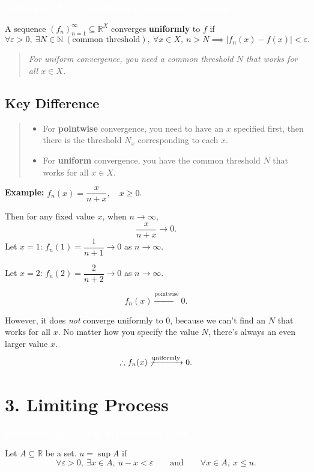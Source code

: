 \documentclass[11pt]{article}
\newcommand{\deftitle}[1]{%
  \vspace{0.6em}
  \noindent\colorbox{defbg!70}{\parbox{\dimexpr\textwidth-2\fboxsep}{\textbf{\textcolor{white}{#1}}}}
  \vspace{0.4em}
}
\newenvironment{note}{\begin{quote}\color{noteblue}\itshape}{\end{quote}}
\newenvironment{remark}{\begin{quote}\color{notepink}}{\end{quote}}
\begin{document}
\deftitle{Definition 1.1.3 --- Functional Convergence: Uniform}

A sequence $(f_n)_{n=1}^{\infty} \subseteq \mathbb{R}^X$ converges \textbf{uniformly} to $f$ if
\[
\forall \varepsilon > 0,\ \exists N \in \mathbb{N}\ (\text{common threshold}),\ \forall x \in X,\ n > N \implies |f_n(x) - f(x)| < \varepsilon.
\]

\begin{note}
For uniform convergence, you need a \emph{common} threshold $N$ that works for all $x \in X$.
\end{note}

\subsection*{Key Difference}
\begin{remark}
\begin{itemize}
  \item For \textbf{pointwise} convergence, you need to have an $x$ specified first, then there is the threshold $N_x$ corresponding to each $x$.
  \item For \textbf{uniform} convergence, you have the common threshold $N$ that works for all $x \in X$.
\end{itemize}
\end{remark}

\noindent \textbf{Example:} $f_n(x) = \dfrac{x}{n+x}, \quad x \geq 0$.

Then for any fixed value $x$, when $n \to \infty$,
\[
\frac{x}{n+x} \to 0.
\]
Let $x = 1$: $f_n(1) = \dfrac{1}{n+1} \to 0$ as $n \to \infty$.

Let $x = 2$: $f_n(2) = \dfrac{2}{n+2} \to 0$ as $n \to \infty$.

\[
f_n(x) \xrightarrow{\text{pointwise}} 0.
\]

However, it does \emph{not} converge uniformly to $0$, because we can't find an $N$ that works for all $x$. No matter how you specify the value $N$, there's always an even larger value $x$.
\[
\therefore f_n(x) \not\xrightarrow{\text{uniformly}} 0.
\]

\section*{3. Limiting Process}

\deftitle{Definition 1.2.1 --- The Supremum of a Set}

Let $A \subseteq \mathbb{R}$ be a set. $u = \sup A$ if
\[
\forall \varepsilon > 0,\ \exists x \in A,\ u - x < \varepsilon \qquad \text{and} \qquad \forall x \in A,\ x \le u.
\]
\end{document}
